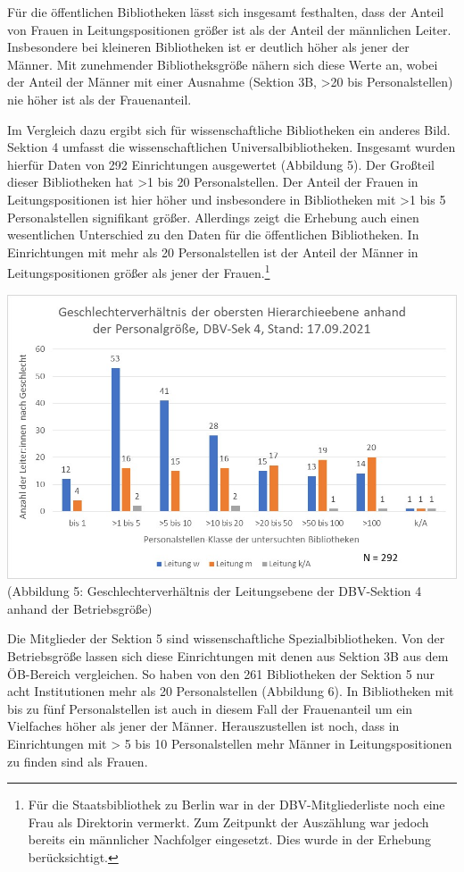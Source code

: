 \documentclass[a4paper,
fontsize=11pt,
oneside,
numbers=noperiodatend,
parskip=half-,
bibliography=totoc,
final
]{scrartcl}
\begin{document}
Für die öffentlichen Bibliotheken lässt sich insgesamt festhalten, dass
der Anteil von Frauen in Leitungspositionen größer ist als der Anteil
der männlichen Leiter. Insbesondere bei kleineren Bibliotheken ist er
deutlich höher als jener der Männer. Mit zunehmender Bibliotheksgröße
nähern sich diese Werte an, wobei der Anteil der Männer mit einer
Ausnahme (Sektion 3B, \textgreater20 bis Personalstellen) nie höher ist
als der Frauenanteil.

Im Vergleich dazu ergibt sich für wissenschaftliche Bibliotheken ein
anderes Bild. Sektion 4 umfasst die wissenschaftlichen
Universalbibliotheken. Insgesamt wurden hierfür Daten von 292
Einrichtungen ausgewertet (Abbildung 5). Der Großteil dieser
Bibliotheken hat \textgreater1 bis 20 Personalstellen. Der Anteil der
Frauen in Leitungspositionen ist hier höher und insbesondere in
Bibliotheken mit \textgreater1 bis 5 Personalstellen signifikant größer.
Allerdings zeigt die Erhebung auch einen wesentlichen Unterschied zu den
Daten für die öffentlichen Bibliotheken. In Einrichtungen mit mehr als
20 Personalstellen ist der Anteil der Männer in Leitungspositionen
größer als jener der Frauen.\footnote{Für die Staatsbibliothek zu Berlin
  war in der DBV-Mitgliederliste noch eine Frau als Direktorin vermerkt.
  Zum Zeitpunkt der Auszählung war jedoch bereits ein männlicher
  Nachfolger eingesetzt. Dies wurde in der Erhebung berücksichtigt.}

\includegraphics{img/Abb_05_DBV-Sek4.jpg}(Abbildung 5:
Geschlechterverhältnis der Leitungsebene der DBV-Sektion 4 anhand der
Betriebsgröße)

Die Mitglieder der Sektion 5 sind wissenschaftliche Spezialbibliotheken.
Von der Betriebsgröße lassen sich diese Einrichtungen mit denen aus
Sektion 3B aus dem ÖB-Bereich vergleichen. So haben von den 261
Bibliotheken der Sektion 5 nur acht Institutionen mehr als 20
Personalstellen (Abbildung 6). In Bibliotheken mit bis zu fünf
Personalstellen ist auch in diesem Fall der Frauenanteil um ein
Vielfaches höher als jener der Männer. Herauszustellen ist noch, dass in
Einrichtungen mit \textgreater{} 5 bis 10 Personalstellen mehr Männer in
Leitungspositionen zu finden sind als Frauen.
\end{document}

